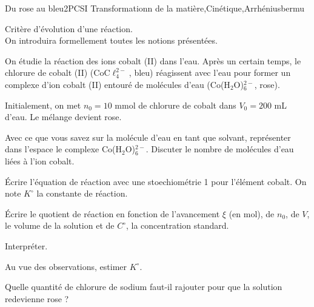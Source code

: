
\begin{exercise}{Du rose au bleu}{2}{PCSI}
{Transformationn de la matière,Cinétique,Arrhénius}{bermu}

\begin{questions}
\questioncours Critère d'évolution d'une réaction. \\
On introduira formellement toutes les notions présentées.

\begin{EnvUplevel}
     On étudie la réaction des ions cobalt (II) dans l'eau. Après un certain temps, le chlorure de cobalt (II) (CoC$\ell_4^{2-}$, bleu) réagissent avec l'eau pour former un complexe d'ion cobalt (II) entouré de molécules d'eau (Co(H$_2$O)$_6^{2-}$, rose).
     
     Initialement, on met $n_0 = 10$ mmol de chlorure de cobalt dans $V_0 = 200$ mL d'eau. Le mélange devient rose.
\end{EnvUplevel}

\question Avec ce que vous savez sur la molécule d'eau en tant que solvant, représenter dans l'espace le complexe Co(H$_2$O)$_6^{2-}$. Discuter le nombre de molécules d'eau liées à l'ion cobalt.

\question \'Ecrire l'équation de réaction avec une stoechiométrie 1 pour l'élément cobalt. On note $K^\circ$ la constante de réaction.

\question \'Ecrire le quotient de réaction en fonction de l'avancement $\xi$ (en mol), de $n_0$, de $V$, le volume de la solution et de $C^\circ$, la concentration standard.


\question Interpréter.

\question Au vue des observations, estimer $K^\circ$.

\question Quelle quantité de chlorure de sodium faut-il rajouter pour que la solution redevienne rose ?

\end{questions}

\end{exercise}